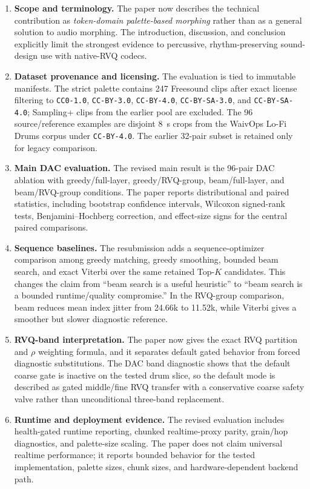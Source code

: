 \documentclass[twoside,a4paper]{article}
\begin{document}
\begin{enumerate}
    \item \textbf{Scope and terminology.} The paper now describes the technical contribution as \emph{token-domain palette-based morphing} rather than as a general solution to audio morphing. The introduction, discussion, and conclusion explicitly limit the strongest evidence to percussive, rhythm-preserving sound-design use with native-RVQ codecs.
    \item \textbf{Dataset provenance and licensing.} The evaluation is tied to immutable manifests. The strict palette contains 247 Freesound clips after exact license filtering to \texttt{CC0-1.0}, \texttt{CC-BY-3.0}, \texttt{CC-BY-4.0}, \texttt{CC-BY-SA-3.0}, and \texttt{CC-BY-SA-4.0}; Sampling+ clips from the earlier pool are excluded. The 96 source/reference examples are disjoint 8~s crops from the WaivOps Lo-Fi Drums corpus under \texttt{CC-BY-4.0}. The earlier 32-pair subset is retained only for legacy comparison.
    \item \textbf{Main DAC evaluation.} The revised main result is the 96-pair DAC ablation with greedy/full-layer, greedy/RVQ-group, beam/full-layer, and beam/RVQ-group conditions. The paper reports distributional and paired statistics, including bootstrap confidence intervals, Wilcoxon signed-rank tests, Benjamini--Hochberg correction, and effect-size signs for the central paired comparisons.
    \item \textbf{Sequence baselines.} The resubmission adds a sequence-optimizer comparison among greedy matching, greedy smoothing, bounded beam search, and exact Viterbi over the same retained Top-$K$ candidates. This changes the claim from ``beam search is a useful heuristic'' to ``beam search is a bounded runtime/quality compromise.'' In the RVQ-group comparison, beam reduces mean index jitter from 24.66k to 11.52k, while Viterbi gives a smoother but slower diagnostic reference.
    \item \textbf{RVQ-band interpretation.} The paper now gives the exact RVQ partition and $\rho$ weighting formula, and it separates default gated behavior from forced diagnostic substitutions. The DAC band diagnostic shows that the default coarse gate is inactive on the tested drum slice, so the default mode is described as gated middle/fine RVQ transfer with a conservative coarse safety valve rather than unconditional three-band replacement.
    \item \textbf{Runtime and deployment evidence.} The revised evaluation includes health-gated runtime reporting, chunked realtime-proxy parity, grain/hop diagnostics, and palette-size scaling. The paper does not claim universal realtime performance; it reports bounded behavior for the tested implementation, palette sizes, chunk sizes, and hardware-dependent backend path.

\end{enumerate}
\end{document}

